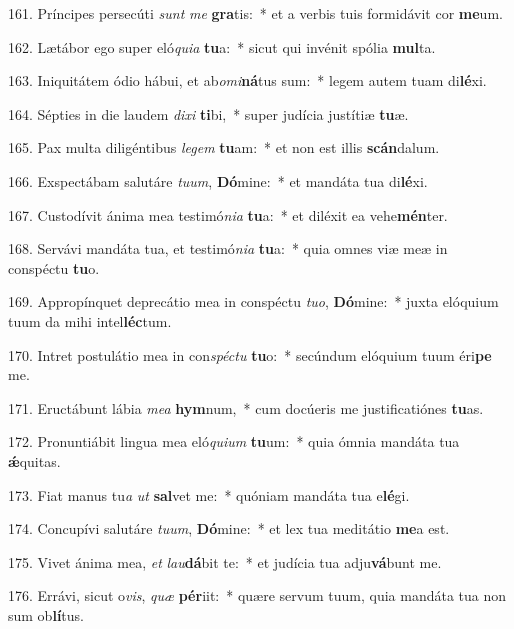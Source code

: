 161. Príncipes persecúti \textit{sunt} \textit{me} \textbf{gra}tis:~*  et a verbis tuis formidávit cor \textbf{me}um.\

162. Lætábor ego super eló\textit{qui}\textit{a} \textbf{tu}a:~*  sicut qui invénit spólia \textbf{mul}ta.\

163. Iniquitátem ódio hábui, et ab\textit{o}\textit{mi}\textbf{ná}tus sum:~*  legem autem tuam di\textbf{lé}xi.\

164. Sépties in die laudem \textit{di}\textit{xi} \textbf{ti}bi,~*  super judícia justítiæ \textbf{tu}æ.\

165. Pax multa diligéntibus \textit{le}\textit{gem} \textbf{tu}am:~*  et non est illis \textbf{scán}dalum.\

166. Exspectábam salutáre \textit{tu}\textit{um}, \textbf{Dó}mine:~*  et mandáta tua di\textbf{lé}xi.\

167. Custodívit ánima mea testimó\textit{ni}\textit{a} \textbf{tu}a:~*  et diléxit ea vehe\textbf{mén}ter.\

168. Servávi mandáta tua, et testimó\textit{ni}\textit{a} \textbf{tu}a:~*  quia omnes viæ meæ in conspéctu \textbf{tu}o.\

169. Appropínquet deprecátio mea in conspéctu \textit{tu}\textit{o}, \textbf{Dó}mine:~*  juxta elóquium tuum da mihi intel\textbf{léc}tum.\

170. Intret postulátio mea in con\textit{spéc}\textit{tu} \textbf{tu}o:~*  secúndum elóquium tuum éri\textbf{pe} me.\

171. Eructábunt lábia \textit{me}\textit{a} \textbf{hym}num,~*  cum docúeris me justificatiónes \textbf{tu}as.\

172. Pronuntiábit lingua mea eló\textit{qui}\textit{um} \textbf{tu}um:~*  quia ómnia mandáta tua \textbf{ǽ}quitas.\

173. Fiat manus tu\textit{a} \textit{ut} \textbf{sal}vet me:~*  quóniam mandáta tua e\textbf{lé}gi.\

174. Concupívi salutáre \textit{tu}\textit{um}, \textbf{Dó}mine:~*  et lex tua meditátio \textbf{me}a est.\

175. Vivet ánima mea, \textit{et} \textit{lau}\textbf{dá}bit te:~*  et judícia tua adju\textbf{vá}bunt me.\

176. Errávi, sicut o\textit{vis}, \textit{quæ} \textbf{pér}iit:~*  quære servum tuum, quia mandáta tua non sum ob\textbf{lí}tus.\

